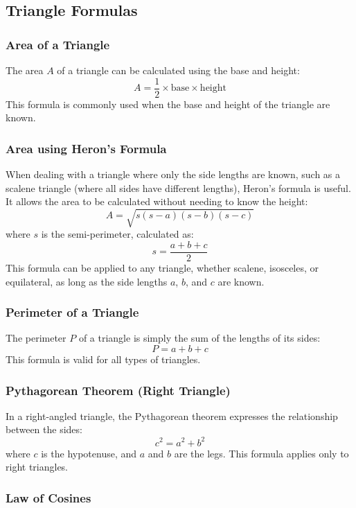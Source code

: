 \subsection{Triangle Formulas}

\subsubsection{Area of a Triangle}

The area \( A \) of a triangle can be calculated using the base and height:
\[
A = \frac{1}{2} \times \text{base} \times \text{height}
\]
This formula is commonly used when the base and height of the triangle are known.

\subsubsection{Area using Heron’s Formula}

When dealing with a triangle where only the side lengths are known, such as a scalene triangle (where all sides have different lengths), Heron’s formula is useful. It allows the area to be calculated without needing to know the height:
\[
A = \sqrt{s(s-a)(s-b)(s-c)}
\]
where \( s \) is the semi-perimeter, calculated as:
\[
s = \frac{a + b + c}{2}
\]
This formula can be applied to any triangle, whether scalene, isosceles, or equilateral, as long as the side lengths \( a \), \( b \), and \( c \) are known.

\subsubsection{Perimeter of a Triangle}

The perimeter \( P \) of a triangle is simply the sum of the lengths of its sides:
\[
P = a + b + c
\]
This formula is valid for all types of triangles.

\subsubsection{Pythagorean Theorem (Right Triangle)}

In a right-angled triangle, the Pythagorean theorem expresses the relationship between the sides:
\[
c^2 = a^2 + b^2
\]
where \( c \) is the hypotenuse, and \( a \) and \( b \) are the legs. This formula applies only to right triangles.

\subsubsection{Law of Cosines}

